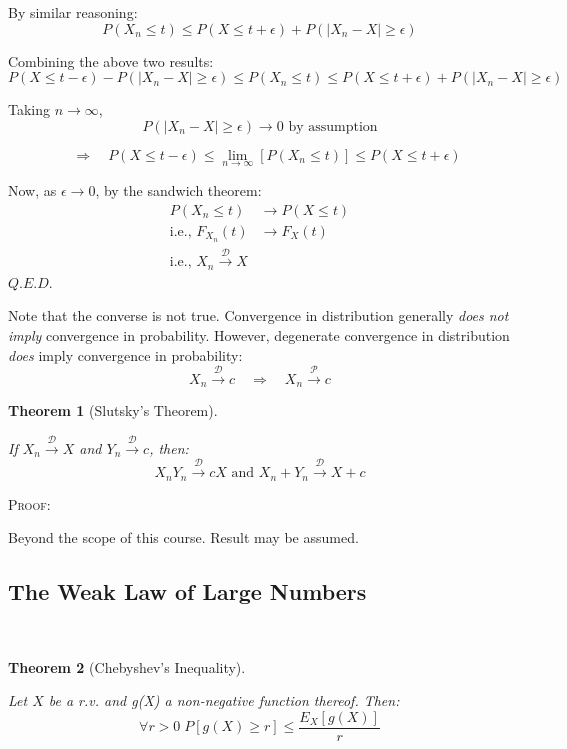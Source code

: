 \documentclass[12pt,a4paper]{article}
\newcommand{\imply}{\quad\Rightarrow\quad}
\newtheorem{thm}{Theorem}[subsection]
\renewcommand{\imply}{\quad\Rightarrow\quad}
\begin{document}
By similar reasoning:
$$P(X_n\leq t) \leq P(X\leq t+\epsilon)+P(\left|X_n-X\right|\geq \epsilon)$$

Combining the above two results:
$$P(X\leq t-\epsilon) - P(\left|X_n-X\right|\geq \epsilon) \leq P(X_n\leq t) \leq P(X\leq t+\epsilon)+P(\left|X_n-X\right|\geq \epsilon)$$

Taking $n\to\infty$,
$$P(\left|X_n-X\right|\geq \epsilon)\to 0 \mbox{ by assumption}$$

$$\imply P(X\leq t-\epsilon) \leq \lim_{n\to\infty}\left[P(X_n\leq t)\right] \leq P(X\leq t+\epsilon)$$

Now, as $\epsilon\to 0$, by the sandwich theorem:
\begin{align*}
P(X_n\leq t) &\to P(X\leq t)\\
\text{i.e., } F_{X_n}(t) &\to F_X(t)\\
\text{i.e., } X_n \xrightarrow{\mathscr{D}} X
\end{align*}\hfill$Q.E.D.$\par\vspace{1cm}

Note that the converse is not true. Convergence in distribution generally \emph{does not imply} convergence in probability. However, degenerate convergence in distribution \emph{does} imply convergence in probability:
$$X_n\xrightarrow{\mathscr{D}} c \imply X_n \xrightarrow{\mathscr{P}} c$$

\begin{thm}[Slutsky's Theorem]$\;$\par\vspace{1cm}

If $X_n\xrightarrow{\mathscr{D}} X$ and $Y_n\xrightarrow{\mathscr{D}}c$, then:
$$X_nY_n\xrightarrow{\mathscr{D}} cX \mbox{ and } X_n+Y_n\xrightarrow{\mathscr{D}} X+c$$

\end{thm}

\noindent\textsc{Proof:}\par\vspace{1cm}

Beyond the scope of this course. Result may be assumed.\par\vspace{1cm}

\subsection{The Weak Law of Large Numbers}$\;$

\begin{thm}[Chebyshev's Inequality]$\;$\par\vspace{1cm}

Let $X$ be a r.v. and g(X) a non-negative function thereof. Then:
$$\forall r>0\; P\left[g(X)\geq r\right] \leq \frac{E_X\left[g(X)\right]}{r}$$

\end{thm}
\end{document}
